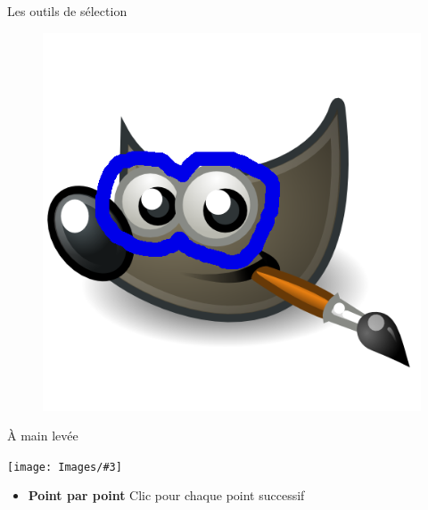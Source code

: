 \documentclass[10pt,svgnames,usenames,table]{beamer}
\newcommand{\tool}[3]{%
	\begin{minipage}{0.40\textwidth}
	\item #1
	\end{minipage}\hfill
	\begin{minipage}{0.20\textwidth}
	\begin{flushright}
	\keys{#2}
	\end{flushright}
	\end{minipage}
	\begin{minipage}{0.06\textwidth}
	\fbox{ou}
	\end{minipage}
	\begin{minipage}{0.1\textwidth}
	\texttt{[image: Images/\#3]}
	\end{minipage}
}
\begin{document}
\begin{frame}[allowframebreaks]{Les outils de sélection}
\begin{enumerate}
\begin{minipage}{0.45\textwidth}
\begin{figure}
	    		\includegraphics[width=\textwidth]{Images/main_levee.png} 
		\end{figure}
		\end{minipage}
	
	\framebreak

	\setcounter{enumi}{3}
	\tool{À main levée}{F}{freeSelect.png}

	\begin{itemize}
		\item \textbf{Point par point} Clic pour chaque point successif 
	\end{itemize}


\end{enumerate}
\end{frame}
\end{document}
